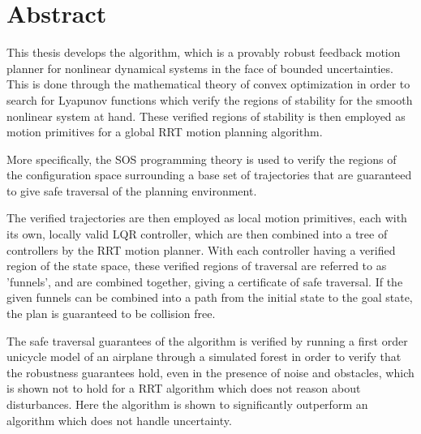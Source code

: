 \chapter{Abstract}

\abstractintoc{} %
\abstractnum %


This thesis develops the \rrtfunnel{} algorithm, which is a provably robust
feedback motion planner for nonlinear dynamical systems in the face of bounded
uncertainties. This is done through the mathematical theory of convex
optimization in order to search for Lyapunov functions which verify the
regions of stability for the smooth nonlinear system at hand. These verified
regions of stability is then employed as motion primitives for a global
\ac{RRT} motion planning algorithm.

More specifically, the \ac{SOS} programming theory is used to verify the
regions of the configuration space surrounding a base set of trajectories that
are guaranteed to give safe traversal of the planning environment.

The verified trajectories are then employed as local motion primitives, each
with its own, locally valid \ac{LQR} controller, which are then combined into
a tree of controllers by the \ac{RRT} motion planner. With each controller
having a verified region of the state space, these verified regions of
traversal are referred to as 'funnels', and are combined together, giving a
certificate of safe traversal. If the given funnels can be combined into a
path from the initial state to the goal state, the plan is guaranteed to be
collision free.

The safe traversal guarantees of the algorithm is verified by running a first
order unicycle model of an airplane through a simulated forest in order to
verify that the robustness guarantees hold, even in the presence of noise and
obstacles, which is shown not to hold for a \ac{RRT} algorithm which does not
reason about disturbances. Here the \rrtfunnel{} algorithm is shown to
significantly outperform an algorithm which does not handle uncertainty.


